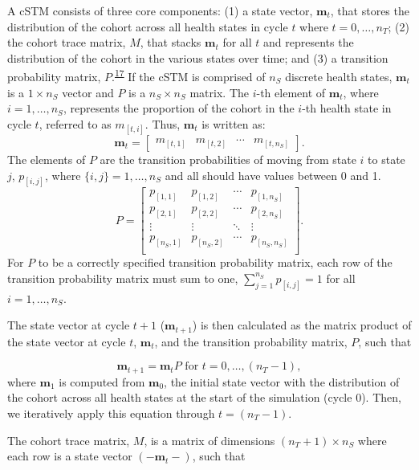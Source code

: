 \documentclass[
]{article}
\begin{document}
A cSTM consists of three core components: (1) a state vector, \(\mathbf{m}_t\), that stores the distribution of the cohort across all health states in cycle \(t\) where \(t = 0,\ldots, n_T\); (2) the cohort trace matrix, \(M\), that stacks \(\mathbf{m}_t\) for all \(t\) and represents the distribution of the cohort in the various states over time; and (3) a transition probability matrix, \(P\).\textsuperscript{\protect\hyperlink{ref-Iskandar2018a}{17}} If the cSTM is comprised of \(n_S\) discrete health states, \(\mathbf{m}_t\) is a \(1 \times n_S\) vector and \(P\) is a \(n_S \times n_S\) matrix. The \(i\)-th element of \(\mathbf{m}_t\), where \(i = 1,\ldots, n_S\), represents the proportion of the cohort in the \(i\)-th health state in cycle \(t\), referred to as \(m_{[t,i]}\). Thus, \(\mathbf{m}_t\) is written as:
\[
\mathbf{m}_t =
  \begin{bmatrix}
m_{[t,1]} & m_{[t,2]} & \cdots & m_{[t,n_S]}
\end{bmatrix}.
\]
The elements of \(P\) are the transition probabilities of moving from state \(i\) to state \(j\), \(p_{[i,j]}\), where \(\{i,j\} = 1,\ldots, n_S\) and all should have values between 0 and 1.
\[
  P = 
  \begin{bmatrix}
    p_{[1,1]} & p_{[1,2]} & \cdots & p_{[1,n_S]} \\
    p_{[2,1]} & p_{[2,2]} & \cdots & p_{[2,n_S]} \\
    \vdots    & \vdots  & \ddots & \vdots   \\
    p_{[n_S,1]} & p_{[n_S,2]} & \cdots & p_{[n_S,n_S]} \\
  \end{bmatrix}.
\]
For \(P\) to be a correctly specified transition probability matrix, each row of the transition probability matrix must sum to one, \(\sum_{j=1}^{n_S}{p_{[i,j]}} = 1\) for all \(i = 1,\ldots,n_S\).

The state vector at cycle \(t+1\) (\(\mathbf{m}_{t+1}\)) is then calculated as the matrix product of the state vector at cycle \(t\), \(\mathbf{m}_{t}\), and the transition probability matrix, \(P\), such that

\[
  \mathbf{m}_{t+1} = \mathbf{m}_{t} P \text{ for } t = 0,\ldots, (n_T - 1),
\]
where \(\mathbf{m}_1\) is computed from \(\mathbf{m}_{0}\), the initial state vector with the distribution of the cohort across all health states at the start of the simulation (cycle 0). Then, we iteratively apply this equation through \(t = \left(n_T-1 \right)\).

The cohort trace matrix, \(M\), is a matrix of dimensions \((n_T+1) \times n_S\) where each row is a state vector \((-\mathbf{m}_{t}-)\), such that
\end{document}
